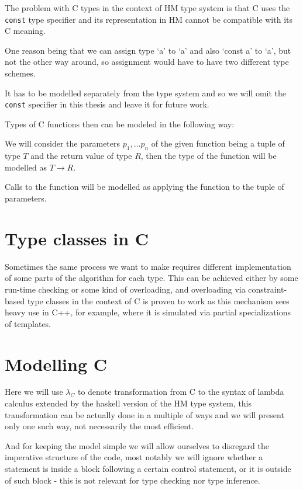 The problem with C types in the context of HM type system is that C uses the \lstinline{const} type specifier and its representation in HM cannot be compatible with its C meaning.

One reason being that we can assign type `a' to `a' and also `const a' to `a', but not the other way around, so assignment would have to have two different type schemes.

It has to be modelled separately from the type system and so we will omit the \lstinline{const} specifier in this thesis and leave it for future work. %

Types of C functions then can be modeled in the following way:

We will consider the parameters $p_1, \dots p_n$ of the given function being a tuple of type $T$ and the return value of type $R$, then the type of the function will be modelled as $T \rightarrow R$.

Calls to the function will be modelled as applying the function to the tuple of parameters.

\section{Type classes in C}

Sometimes the same process we want to make requires different implementation of some parts of the algorithm for each type. This can be achieved either by some run-time checking or some kind of overloading, and overloading via constraint-based type classes in the context of C is proven to work as this mechanism sees heavy use in C++, for example,
where it is simulated via partial specializations of templates.


\section{Modelling C}

Here we will use $\lambda_C$ to denote transformation from C to the syntax of lambda calculus extended by the haskell version of the HM type system, this transformation can be actually done in a multiple of ways and we will present only one such way, not necessarily the most efficient.

And for keeping the model simple we will allow ourselves to disregard the imperative structure of the code, most notably we will ignore whether a statement is inside a block following a certain control statement, or it is outside of such block - this is not relevant for type checking nor type inference.


